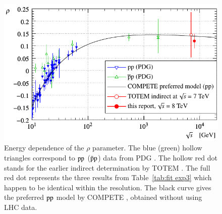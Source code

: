 \begin{figure}
\begin{center}
\includegraphics{fig/rho_s.pdf}
\caption{Energy dependence of the $\rho$ parameter. The blue (green) hollow triangles correspond to $\rm pp$ ($\rm \bar pp$) data from PDG \cite{pdg} . The hollow red dot stands for the earlier indirect determination by TOTEM \cite{epl101-tot}. The full red dot represents the three results from Table~\ref{tab:fit exp3} which happen to be identical within the resolution. The black curve gives the preferred $\rm pp$ model by COMPETE \cite{compete}, obtained without using LHC data.
}%
\label{fig:rho cmp exp3}
\end{center}
\end{figure}
